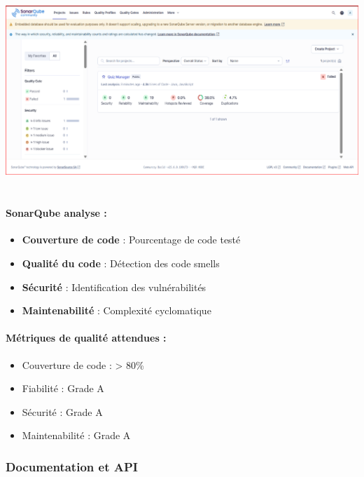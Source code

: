 \documentclass[12pt,a4paper,twoside]{report}
\begin{document}
\includegraphics[width=6.15694in,height=2.94861in]{latex_media/media/image43.png}

\hypertarget{sonarqube-analyse}{%
\paragraph{SonarQube analyse :}\label{sonarqube-analyse}}

\begin{itemize}
\item
  \textbf{Couverture de code} : Pourcentage de code testé
\item
  \textbf{Qualité du code} : Détection des code smells
\item
  \textbf{Sécurité} : Identification des vulnérabilités
\item
  \textbf{Maintenabilité} : Complexité cyclomatique
\end{itemize}

\hypertarget{muxe9triques-de-qualituxe9-attendues}{%
\paragraph{Métriques de qualité attendues
:}\label{muxe9triques-de-qualituxe9-attendues}}

\begin{itemize}
\item
  Couverture de code : \textgreater{} 80\%
\item
  Fiabilité : Grade A
\item
  Sécurité : Grade A
\item
  Maintenabilité : Grade A
\end{itemize}

\hypertarget{documentation-et-api}{%
\subsubsection{Documentation et API}\label{documentation-et-api}}
\end{document}
